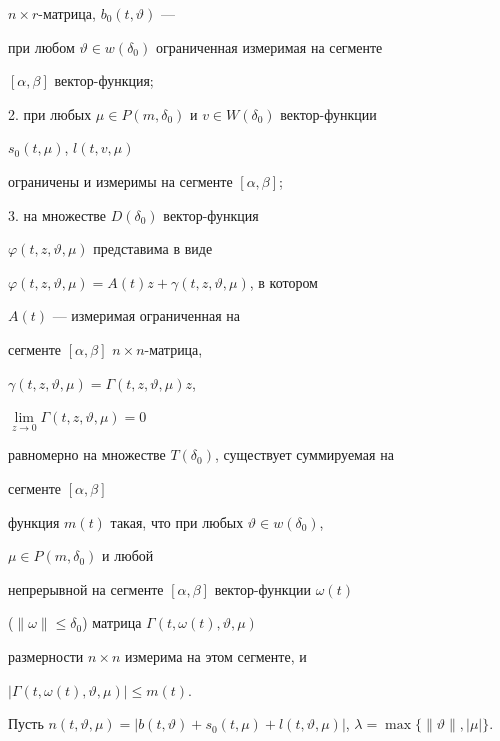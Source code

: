 $n\times r$-матрица, $b_0(t,\vartheta)$ --- 


при любом $\vartheta\in w(\delta_0)$ ограниченная измеримая на сегменте 


$[\alpha,\beta]$ вектор-функция; 


 


2. при любых $\mu\in P(m,\delta_0)$ и $v\in W(\delta_0)$ вектор-функции 


$s_0(t,\mu)$, $l(t,v,\mu)$ 


ограничены и измеримы на сегменте $[\alpha,\beta]$; 


 


3. на множестве $D(\delta_0)$ вектор-функция 


$\varphi(t,z,\vartheta,\mu)$ представима в виде 


$\varphi(t,z,\vartheta,\mu)=A(t)z+\gamma(t,z,\vartheta,\mu)$, в котором 


$A(t)$ --- измеримая ограниченная на 


сегменте $[\alpha,\beta]$\; $n\times n$-матрица, 


$\gamma(t,z,\vartheta,\mu)=\Gamma(t,z,\vartheta,\mu)z$, 


$\lim\limits_{z\to0}\Gamma(t,z,\vartheta,\mu)=0$ 


равномерно на множестве $T(\delta_0)$, существует суммируемая на 


сегменте $[\alpha,\beta]$ 


функция $m(t)$ такая, что при любых $\vartheta\in w(\delta_0)$, 


$\mu\in P(m,\delta_0)$ и любой 


непрерывной на сегменте $[\alpha,\beta]$ вектор-функции $\omega(t)$ 


($\|\omega\|\le\delta_0$) матрица $\Gamma(t,\omega(t),\vartheta,\mu)$ 


размерности $n\times n$ измерима на этом сегменте, и 


$|\Gamma(t,\omega(t),\vartheta,\mu)|\le m(t)$. 


 


Пусть $n(t,\vartheta,\mu)=|b(t,\vartheta)+s_0(t,\mu)+ 


l(t,\vartheta,\mu)|$, $\lambda=\max\{\|\vartheta\|,|\mu|\}$. 


 


